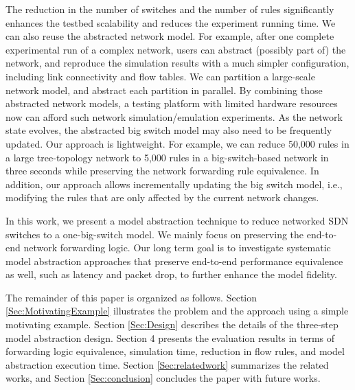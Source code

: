 The reduction in the number of switches and the number of rules significantly enhances the testbed scalability and reduces the experiment running time.  We can also reuse the abstracted network model. For example, after one complete experimental run of a complex network, users can abstract (possibly part of) the network, and reproduce the simulation results with a much simpler configuration, including link connectivity and flow tables. We can partition a large-scale network model, and abstract each partition in parallel. By combining those abstracted network models, a testing platform with limited hardware resources now can afford such network simulation/emulation experiments. As the network state evolves, the abstracted big switch model may also need to be frequently updated. Our approach is lightweight. For example, we can reduce 50,000 rules in a large tree-topology network to 5,000 rules in a big-switch-based network in three seconds while preserving the network forwarding rule equivalence. In addition, our approach allows incrementally updating the big switch model, i.e., modifying the rules that are only affected by the current network changes.

In this work, we present a model abstraction technique to reduce networked SDN switches to a one-big-switch model. We mainly focus on preserving the end-to-end network forwarding logic. Our long term goal is to investigate systematic model abstraction approaches that preserve end-to-end performance equivalence as well, such as latency and packet drop, to further enhance the model fidelity.

The remainder of this paper is organized as follows. Section  \ref{Sec:MotivatingExample} illustrates the problem and the approach using a simple motivating example. Section \ref{Sec:Design} describes the details of the three-step model abstraction design. Section 4 presents the evaluation results in terms of forwarding logic equivalence, simulation time, reduction in flow rules, and model abstraction execution time. Section \ref{Sec:relatedwork} summarizes the related works, and Section \ref{Sec:conclusion} concludes the paper with future works.


